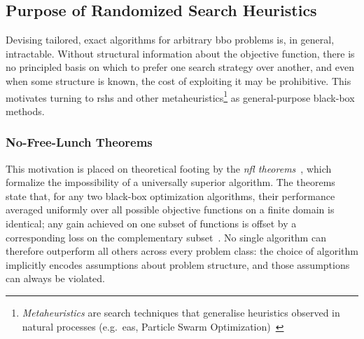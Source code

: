 \subsection{Purpose of Randomized Search Heuristics}
%
Devising tailored, exact algorithms for arbitrary \acrshort{bbo}
problems is, in general,
intractable. Without structural information about the objective
function, there is no
principled basis on which to prefer one search strategy over another,
and even when
some structure is known, the cost of exploiting it may be prohibitive. This
motivates turning to \acrfull{rsh}s and other
metaheuristics\footnote{\textit{Metaheuristics}
  are search techniques that generalise heuristics observed in natural processes
  (e.g.\ \acrshort{ea}s, Particle Swarm
Optimization)~\cite{abdel2018metaheuristic}} as
general-purpose black-box methods.

\subsubsection{No-Free-Lunch Theorems}
\label{subsubsec:nfl}

This motivation is placed on theoretical footing by the
\textit{\acrfull{nfl} theorems}~\cite{wolpert2002no}, which formalize the
impossibility of a universally superior algorithm. The theorems state
that, for any two
black-box optimization algorithms, their performance averaged uniformly over all
possible objective functions on a finite domain is identical; any
gain achieved on one
subset of functions is offset by a corresponding loss on the complementary
subset~\cite{wolpert2002no}. No single algorithm can therefore
outperform all others
across every problem class: the choice of algorithm implicitly
encodes assumptions about
problem structure, and those assumptions can always be violated.


